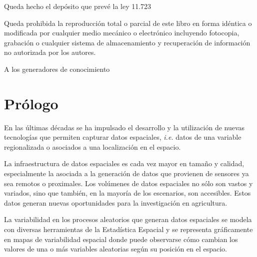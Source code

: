 \documentclass[11pt,b5paper,]{krantz}
\begin{document}
Queda hecho el depósito que prevé la ley 11.723



\bigskip
\small{
Queda prohibida la reproducción total o parcial de este libro en forma idéntica o modificada por cualquier medio mecánico o electrónico incluyendo fotocopia, grabación o cualquier sistema de almacenamiento y recuperación de información no autorizada por los autores.
}

\newpage

\hfill	\large{ A los generadores de conocimiento} 


\setlength{\abovedisplayskip}{-3pt}
\setlength{\abovedisplayshortskip}{-3pt}

{
\hypersetup{linkcolor=black}
\setcounter{tocdepth}{2}
\tableofcontents
}
\chapter*{Prólogo}\label{pruxf3logo}


En las últimas décadas se ha impulsado el desarrollo y la utilización de
nuevas tecnologías que permiten capturar datos espaciales, \emph{i.e.}
datos de una variable regionalizada o asociados a una localización en el
espacio.

La infraestructura de datos espaciales es cada vez mayor en tamaño y
calidad, especialmente la asociada a la generación de datos que
provienen de sensores ya sea remotos o proximales. Los volúmenes de
datos espaciales no sólo son vastos y variados, sino que también, en la
mayoría de los escenarios, son accesibles. Estos datos generan nuevas
oportunidades para la investigación en agricultura.

La variabilidad en los procesos aleatorios que generan datos espaciales
se modela con diversas herramientas de la Estadística Espacial y se
representa gráficamente en mapas de variabilidad espacial donde puede
observarse cómo cambian los valores de una o más variables aleatorias
según su posición en el espacio.
\end{document}
